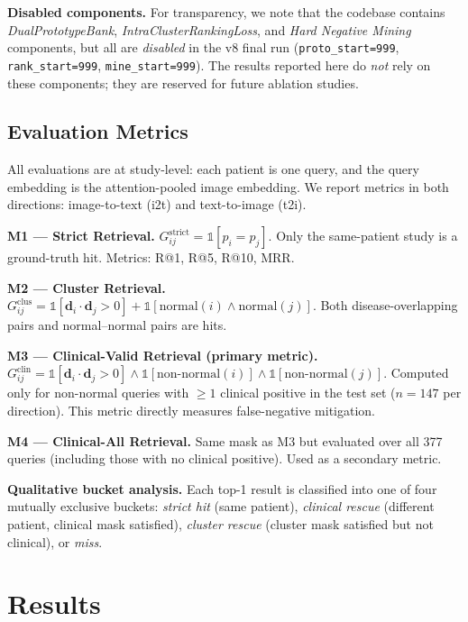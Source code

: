 \documentclass[11pt, a4paper]{article}
\newcommand{\vv}[1]{\mathbf{#1}}
\begin{document}
\textbf{Disabled components.}
For transparency, we note that the codebase contains
\emph{DualPrototypeBank}, \emph{IntraClusterRankingLoss}, and
\emph{Hard Negative Mining} components, but all are \emph{disabled} in the
v8 final run
(\texttt{proto\_start=999}, \texttt{rank\_start=999},
\texttt{mine\_start=999}).
The results reported here do \emph{not} rely on these components; they are
reserved for future ablation studies.

\subsection{Evaluation Metrics}
\label{sec:metrics}

All evaluations are at study-level: each patient is one query, and the
query embedding is the attention-pooled image embedding.
We report metrics in both directions: image-to-text (i2t) and
text-to-image (t2i).

\textbf{M1 --- Strict Retrieval.}
$G^{\mathrm{strict}}_{ij} = \mathbb{1}[p_i=p_j]$.
Only the same-patient study is a ground-truth hit.
Metrics: R@1, R@5, R@10, MRR.

\textbf{M2 --- Cluster Retrieval.}
$G^{\mathrm{clus}}_{ij} = \mathbb{1}[\vv{d}_i\!\cdot\!\vv{d}_j>0]
  + \mathbb{1}[\mathrm{normal}(i)\wedge\mathrm{normal}(j)]$.
Both disease-overlapping pairs and normal--normal pairs are hits.

\textbf{M3 --- Clinical-Valid Retrieval (primary metric).}
$G^{\mathrm{clin}}_{ij} = \mathbb{1}[\vv{d}_i\!\cdot\!\vv{d}_j>0]
  \wedge\mathbb{1}[\mathrm{non{\text{-}}normal}(i)]
  \wedge\mathbb{1}[\mathrm{non{\text{-}}normal}(j)]$.
Computed only for non-normal queries with $\geq\!1$ clinical positive
in the test set ($n\!=\!147$ per direction).
This metric directly measures false-negative mitigation.

\textbf{M4 --- Clinical-All Retrieval.}
Same mask as M3 but evaluated over all 377 queries (including those with
no clinical positive). Used as a secondary metric.

\textbf{Qualitative bucket analysis.}
Each top-1 result is classified into one of four mutually exclusive buckets:
\emph{strict hit} (same patient), \emph{clinical rescue} (different patient,
clinical mask satisfied), \emph{cluster rescue} (cluster mask satisfied
but not clinical), or \emph{miss}.

\section{Results}
\label{sec:results}
\end{document}
